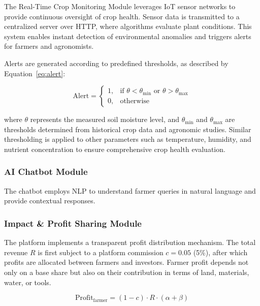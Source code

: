\documentclass[9pt,twocolumn,twoside]{article}
\begin{document}
The Real-Time Crop Monitoring Module leverages IoT sensor networks to provide continuous oversight of crop health. Sensor data is transmitted to a centralized server over HTTP, where algorithms evaluate plant conditions. This system enables instant detection of environmental anomalies and triggers alerts for farmers and agronomists.

Alerts are generated according to predefined thresholds, as described by Equation~\ref{eq:alert}:

\begin{equation}
    \text{Alert} =
    \begin{cases}
    1, & \text{if } \theta < \theta_{\min} \text{ or } \theta > \theta_{\max} \\
    0, & \text{otherwise}
    \end{cases}
    \label{eq:alert}
\end{equation}

where $\theta$ represents the measured soil moisture level, and $\theta_{\min}$ and $\theta_{\max}$ are thresholds determined from historical crop data and agronomic studies. Similar thresholding is applied to other parameters such as temperature, humidity, and nutrient concentration to ensure comprehensive crop health evaluation.

\subsubsection{AI Chatbot Module}

The chatbot employs NLP to understand farmer queries in natural language and provide contextual responses.


\subsubsection{Impact \& Profit Sharing Module}

The platform implements a transparent profit distribution mechanism. The total revenue $R$ is first subject to a platform commission $c = 0.05$ (5\%), after which profits are allocated between farmers and investors. Farmer profit depends not only on a base share but also on their contribution in terms of land, materials, water, or tools.

\begin{equation}
    \text{Profit}_{\text{farmer}} = (1 - c) \cdot R \cdot (\alpha + \beta)
    \label{eq:farmer_profit}
\end{equation}
\end{document}
